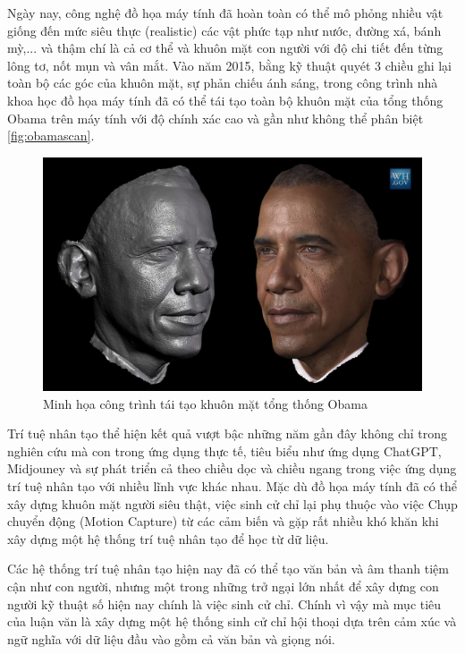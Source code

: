 Ngày nay, công nghệ đồ họa máy tính đã hoàn toàn có thể mô phỏng nhiều vật giống đến mức siêu thực (realistic) các vật phức tạp như nước, đường xá, bánh mỳ,...  và thậm chí là cả cơ thể và khuôn mặt con người với độ chi tiết đến từng lông tơ, nốt mụn và vân mắt. 
Vào năm 2015, bằng kỹ thuật quyét 3 chiều ghi lại toàn bộ các góc của khuôn mặt, sự phản chiếu ánh sáng, trong công trình \cite{metallo2015scanning}
nhà khoa học đồ họa máy tính đã có thể tái tạo toàn bộ khuôn mặt của tổng thống Obama trên máy tính với độ chính xác cao và gần như không thể phân biệt \autoref{fig:obamascan}.

\begin{figure}
    \centering
    \includegraphics[width=\linewidth]{images/obama_scan.jpg}
    \caption{Minh họa công trình tái tạo khuôn mặt tổng thống Obama}
    \label{fig:obamascan}
\end{figure}

Trí tuệ nhân tạo thể hiện kết quả vượt bậc những năm gần đây không chỉ trong nghiên cứu mà con trong ứng dụng thực tế, tiêu biểu như ứng dụng ChatGPT, Midjouney và sự phát triển cả theo chiều dọc và chiều ngang trong việc ứng dụng trí tuệ nhân tạo với nhiều lĩnh vực khác nhau. Mặc dù đồ họa máy tính đã có thể xây dựng khuôn mặt người siêu thật, việc sinh cử chỉ lại phụ thuộc vào việc Chụp chuyển động (Motion Capture) từ các cảm biến và gặp rất nhiều khó khăn khi xây dựng một hệ thống trí tuệ nhân tạo để học từ dữ liệu.

Các hệ thống trí tuệ nhân tạo hiện nay đã có thể tạo văn bản và âm thanh tiệm cận như con người, nhưng một trong những trở ngại lớn nhất để xây dựng con người kỹ thuật số hiện nay chính là việc sinh cử chỉ. Chính vì vậy mà mục tiêu của luận văn là xây dựng một hệ thống sinh cử chỉ hội thoại dựa trên cảm xúc và ngữ nghĩa với dữ liệu đầu vào gồm cả văn bản và giọng nói.

